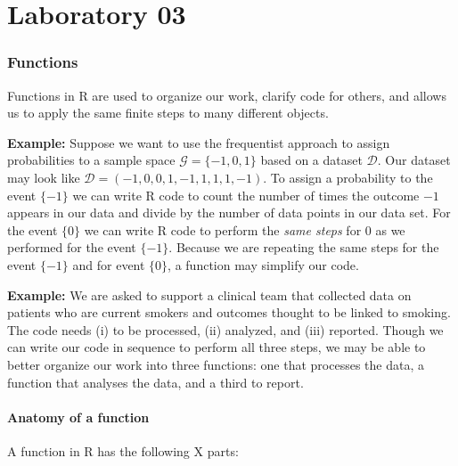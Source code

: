 
\chapter{Laboratory 03}

    
\hypertarget{functions}{%
\subsection{Functions}\label{functions}}

Functions in R are used to organize our work, clarify code for others,
and allows us to apply the same finite steps to many different objects.

\textbf{Example:} Suppose we want to use the frequentist approach to
assign probabilities to a sample space \(\mathcal{G} = \{-1,0,1\}\)
based on a dataset \(\mathcal{D}\). Our dataset may look like
\(\mathcal{D} = (-1,0,0,1,-1,1,1,1,-1)\). To assign a probability to the
event \(\{-1\}\) we can write R code to count the number of times the
outcome \(-1\) appears in our data and divide by the number of data
points in our data set. For the event \(\{0\}\) we can write R code to
perform the \emph{same steps} for 0 as we performed for the event
\(\{-1\}\). Because we are repeating the same steps for the event
\(\{-1\}\) and for event \(\{0\}\), a function may simplify our code.

\textbf{Example:} We are asked to support a clinical team that collected
data on patients who are current smokers and outcomes thought to be
linked to smoking. The code needs (i) to be processed, (ii) analyzed,
and (iii) reported. Though we can write our code in sequence to perform
all three steps, we may be able to better organize our work into three
functions: one that processes the data, a function that analyses the
data, and a third to report.

    \hypertarget{anatomy-of-a-function}{%
\subsubsection{Anatomy of a function}\label{anatomy-of-a-function}}

A function in R has the following X parts:

